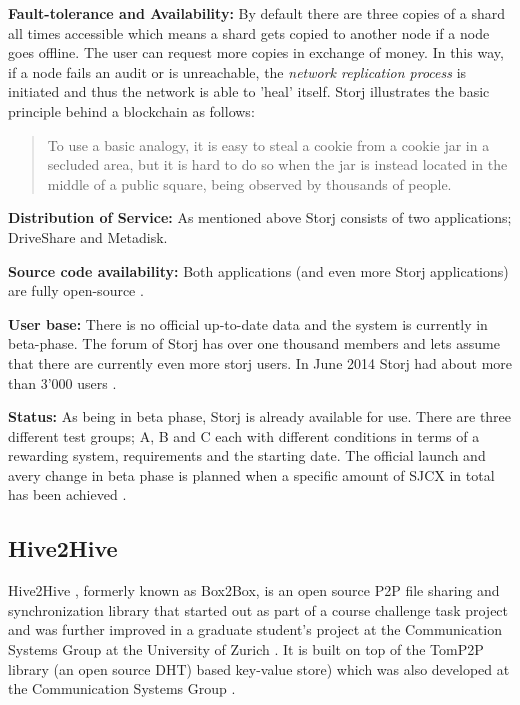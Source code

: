 \textbf{Fault-tolerance and Availability:} By default there are three copies of a shard all times accessible which means a shard gets copied to another node if a node goes offline. The user can request more copies in exchange of money. In this way, if a node fails an audit or is unreachable, the \textit{network replication process} is initiated and thus the network is able to 'heal' itself. Storj illustrates the basic principle behind a blockchain as follows:

\begin{quotation}
To use a basic analogy, it is easy to steal a cookie from a cookie jar in a secluded area, but it is hard to do so when the jar is instead located in the middle of a public square, being observed by thousands of people. \cite{storj:PDF}
\end{quotation}

\textbf{Distribution of Service:} As mentioned above Storj consists of two applications; DriveShare and Metadisk.

\textbf{Source code availability:} Both applications (and even more Storj applications) are fully open-source \cite{storj:github}.

\textbf{User base:} There is no official up-to-date data and the system is currently in beta-phase. The forum of Storj has over one thousand members \cite{storj:forum} and lets assume that there are currently even more storj users. In June 2014 Storj had about more than 3'000 users \cite{storj:crowdsale}.

\textbf{Status:} As being in beta phase, Storj is already available for use. There are three different test groups; A, B and C each with different conditions in terms of a rewarding system, requirements and the starting date. The official launch and avery change in beta phase is planned when a specific amount of SJCX in total has been achieved \cite {storj:earlyaccess}.

\subsection{Hive2Hive}
Hive2Hive \cite{hive2hive}, formerly known as Box2Box, is an open source P2P file sharing and synchronization library that started out as part of a course challenge task project and was further improved in a graduate student's project at the Communication Systems Group at the University of Zurich \cite{hive2hive:about}. It is built on top of the TomP2P library (an open source DHT) based key-value store) which was also developed at the Communication Systems Group \cite{tomp2p}.

